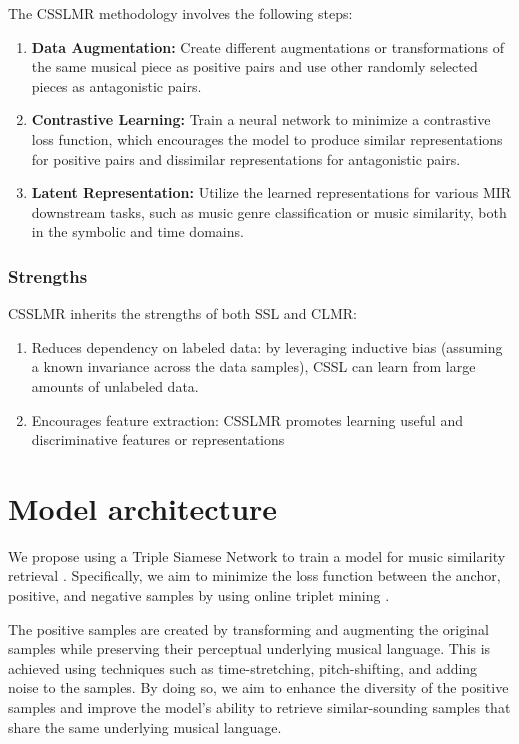 The CSSLMR methodology involves the following steps:

\begin{enumerate}
\item \textbf{Data Augmentation:} Create different augmentations or transformations of the same musical piece as positive pairs and use other randomly selected pieces as antagonistic pairs.
\item \textbf{Contrastive Learning:} Train a neural network to minimize a contrastive loss function, which encourages the model to produce similar representations for positive pairs and dissimilar representations for antagonistic pairs.
\item\textbf{Latent Representation:} Utilize the learned representations for various MIR downstream tasks, such as music genre classification or music similarity, both in the symbolic and time domains.
\end{enumerate} 

\subsubsection{Strengths}

CSSLMR inherits the strengths of both SSL and CLMR:

\begin{enumerate}
\item Reduces dependency on labeled data: by leveraging inductive bias (assuming a known invariance across the data samples), CSSL can learn from large amounts of unlabeled data.
\item Encourages feature extraction: CSSLMR promotes learning useful and discriminative features or representations
\end{enumerate} 

\section{Model architecture}

We propose using a Triple Siamese Network to train a model for music similarity retrieval \cite{contentmusicsimtriplet2020}. Specifically, we aim to minimize the loss function between the anchor, positive, and negative samples by using online triplet mining \cite{Sikaroudi2020OfflinePatches}.

The positive samples are created by transforming and augmenting the original samples while preserving their perceptual underlying musical language. This is achieved using techniques such as time-stretching, pitch-shifting, and adding noise to the samples. By doing so, we aim to enhance the diversity of the positive samples and improve the model's ability to retrieve similar-sounding samples that share the same underlying musical language.

